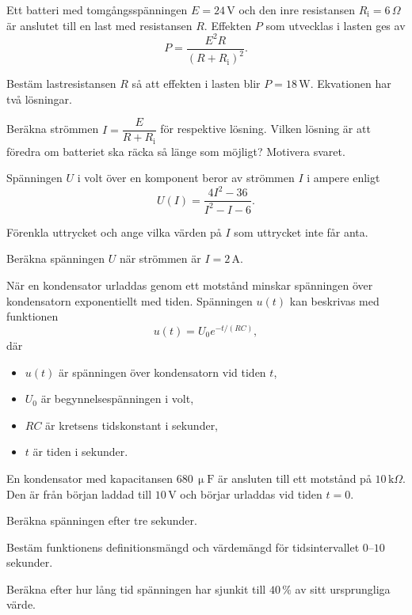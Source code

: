Ett batteri med tomgångsspänningen $E = 24\,\text{V}$ och den inre resistansen
$R_{\text{i}} = 6\,\Omega$ är anslutet till en last med resistansen $R$. Effekten $P$ som
utvecklas i lasten ges av
\[
  P = \frac{E^2 R}{(R + R_{\text{i}})^2}.
\]
\begin{parts}
  \item Bestäm lastresistansen $R$ så att effekten i lasten blir $P = 18\,\text{W}$. Ekvationen
    har två lösningar.
  \item Beräkna strömmen $I = \dfrac{E}{R + R_{\text{i}}}$ för respektive lösning. Vilken lösning
    är att föredra om batteriet ska räcka så länge som möjligt? Motivera svaret.
\end{parts}

Spänningen $U$ i volt över en komponent beror av strömmen $I$ i ampere enligt
\[
  U(I) = \frac{4I^2 - 36}{I^2 - I - 6}.
\]
\begin{parts}
  \item Förenkla uttrycket och ange vilka värden på $I$ som uttrycket inte får anta.
  \item Beräkna spänningen $U$ när strömmen är $I = 2\,\text{A}$.
\end{parts}

När en kondensator urladdas genom ett motstånd minskar spänningen över kondensatorn exponentiellt
med tiden. Spänningen $u(t)$ kan beskrivas med funktionen
\[
  u(t) = U_0 e^{-t/(RC)},
\]
där
\begin{itemize}
  \item $u(t)$ är spänningen över kondensatorn vid tiden $t$,
  \item $U_0$ är begynnelsespänningen i volt,
  \item $RC$ är kretsens tidskonstant i sekunder,
  \item $t$ är tiden i sekunder.
\end{itemize}
En kondensator med kapacitansen $680\,\upmu\text{F}$ är ansluten till ett motstånd på
$10\,\text{k}\Omega$. Den är från början laddad till $10\,\text{V}$ och börjar urladdas vid tiden
$t = 0$.
\begin{parts}
  \item Beräkna spänningen efter tre sekunder.
  \item Bestäm funktionens definitionsmängd och värdemängd för tidsintervallet $0$--$10$
    sekunder.
  \item Beräkna efter hur lång tid spänningen har sjunkit till $40\,\%$ av sitt ursprungliga
    värde.
\end{parts}

